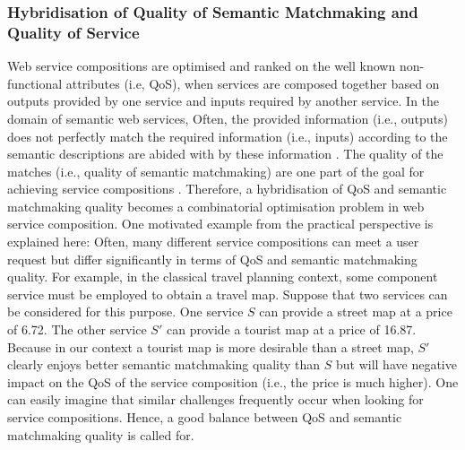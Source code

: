 \subsubsection{Hybridisation of Quality of Semantic Matchmaking and Quality of Service}
Web service compositions are optimised and ranked on the well known non-functional attributes (i.e, QoS), when services are composed together based on outputs provided by one service and inputs required by another service. In the domain of semantic web services, Often, the provided information (i.e., outputs) does not perfectly match the required information (i.e., inputs) according to the semantic descriptions are abided with by these information \cite{lecue2008optimizing}. The quality of the matches (i.e., quality of semantic matchmaking) are one part of the goal for achieving service compositions \cite{lecue2009optimizing}. Therefore, a hybridisation of QoS and semantic matchmaking quality becomes a combinatorial optimisation problem in web service composition. One motivated example from the practical perspective is explained here: Often, many different service compositions can meet a user request but differ significantly in terms of QoS and semantic matchmaking quality. For example, in the classical travel planning context, some component service must be employed to obtain a travel map. Suppose that two services can be considered for this purpose. One service $S$ can provide a street map at a price of 6.72. The other service $S'$ can provide a tourist map at a price of 16.87. Because in our context a tourist map is more desirable than a street map, $S'$ clearly enjoys better semantic matchmaking quality than $S$ but will have negative impact on the QoS of the service composition (i.e., the price is much higher). One can easily imagine that similar challenges frequently occur when looking for service compositions. Hence, a good balance between QoS and semantic matchmaking quality is called for.

